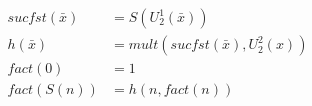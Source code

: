 \documentclass[a4paper, 12pt]{article}
\newcommand{\+}{\enspace}
\begin{document}
\begin{align*}
	sucfst(\bar x) &= S(U^1_2(\bar x)) \\
	h(\bar{x}) &= mult(sucfst(\bar x), U^2_2(x)) \\
	fact(0) &= 1 \\
	fact(S(n)) &= h(n, fact(n))
\end{align*}

\iffalse
\section*{8.}

\begin{align*}
	le(0,n) &= 1 \\
	le(S(m),n) &=  \\
	lt(m,n) &= le(S(m), n) \\
	min(0,n) &= 0 \\
	min(S(m), n) &= min(m,n) + lt(m, n)
\end{align*}
\fi
\end{document}
